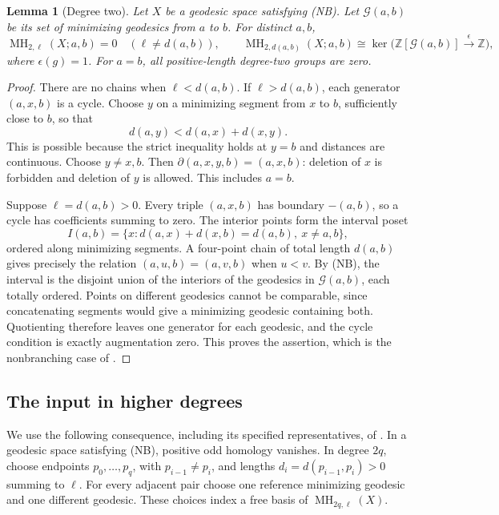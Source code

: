 \documentclass[12pt]{amsart}
\newtheorem{lem}[thm]{Lemma}
\theoremstyle{definition}
\theoremstyle{remark}
\numberwithin{equation}{section}
\newcommand{\Z}{\mathbb{Z}}
\DeclareMathOperator{\MH}{MH}
\begin{document}
\begin{lem}[Degree two]\label{lem:degree-two}
Let $X$ be a geodesic space satisfying (NB). Let $\mathcal G(a,b)$ be its set of minimizing geodesics from $a$ to $b$. For distinct $a,b$,
\[
 \MH_{2,\ell}(X;a,b)=0\quad(\ell\ne d(a,b)),\qquad
 \MH_{2,d(a,b)}(X;a,b)\cong\ker\bigl(\Z[\mathcal G(a,b)]\xrightarrow{\epsilon}\Z\bigr),
\]
where $\epsilon(g)=1$. For $a=b$, all positive-length degree-two groups are zero.
\end{lem}
\begin{proof}
There are no chains when $\ell<d(a,b)$. If $\ell>d(a,b)$, each generator $(a,x,b)$ is a cycle. Choose $y$ on a minimizing segment from $x$ to $b$, sufficiently close to $b$, so that
\[
 d(a,y)<d(a,x)+d(x,y).
\]
This is possible because the strict inequality holds at $y=b$ and distances are continuous. Choose $y\ne x,b$. Then $\partial(a,x,y,b)=(a,x,b)$: deletion of $x$ is forbidden and deletion of $y$ is allowed. This includes $a=b$.

Suppose $\ell=d(a,b)>0$. Every triple $(a,x,b)$ has boundary $-(a,b)$, so a cycle has coefficients summing to zero. The interior points form the interval poset
\[
 I(a,b)=\{x:d(a,x)+d(x,b)=d(a,b),\ x\ne a,b\},
\]
ordered along minimizing segments. A four-point chain of total length $d(a,b)$ gives precisely the relation $(a,u,b)=(a,v,b)$ when $u<v$. By (NB), the interval is the disjoint union of the interiors of the geodesics in $\mathcal G(a,b)$, each totally ordered. Points on different geodesics cannot be comparable, since concatenating segments would give a minimizing geodesic containing both. Quotienting therefore leaves one generator for each geodesic, and the cycle condition is exactly augmentation zero. This proves the assertion, which is the nonbranching case of \cite[Corollary 3.15]{Gomi}.
\end{proof}

\subsection{The input in higher degrees}
We use the following consequence, including its specified representatives, of \cite[Definition 5.11, Proposition 5.15, Theorem 5.22]{Gomi}. In a geodesic space satisfying (NB), positive odd homology vanishes. In degree $2q$, choose endpoints $p_0,\ldots,p_q$, with $p_{i-1}\ne p_i$, and lengths $d_i=d(p_{i-1},p_i)>0$ summing to $\ell$. For every adjacent pair choose one reference minimizing geodesic and one different geodesic. These choices index a free basis of $\MH_{2q,\ell}(X)$.
\end{document}
